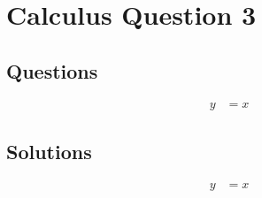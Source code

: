 \chapter{Calculus Question 3}
\label{chap:cq3}

\section{Questions}
\label{sec:cq3q}
\begin{align}
  y &= x
\end{align}

\section{Solutions}
\label{sec:cq3s}
\begin{align}
  y &= x
\end{align}